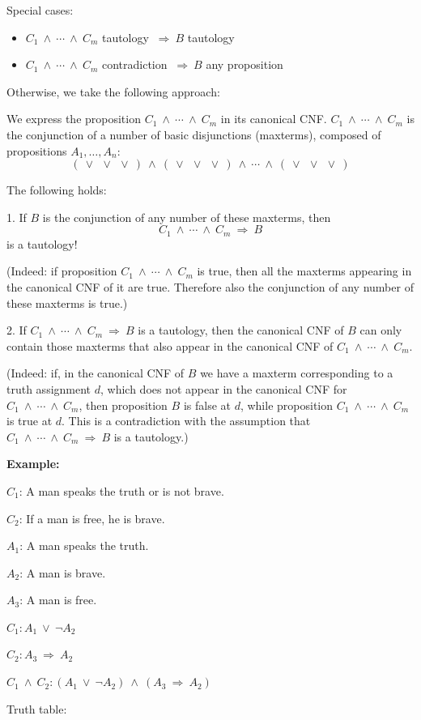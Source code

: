 \documentclass[11pt,paper=b5,footinclude,headinclude]{scrbook} %
\def\ali {{~\vee~}}
\def\inn {{~\wedge~}}
\def\sledi {{~\Rightarrow~}}
\theoremstyle{remark}
\theoremstyle{definition} %
\theoremstyle{theorem} %
\begin{document}
Special cases:
\begin{itemize}
  \item $C_1\inn\cdots\inn C_m$ tautology  $\sledi B$ tautology
  \item $C_1\inn\cdots\inn C_m$ contradiction $\sledi B$ any proposition
\end{itemize}

Otherwise, we take the following approach:

We express the proposition $C_1\inn\cdots\inn C_m$ in its canonical CNF.
$C_1\inn\cdots\inn C_m$ is the conjunction of a number of basic disjunctions (maxterms), composed of
propositions $A_1,\ldots, A_n$:
$$( \ali\ali\ali) \inn ( \ali\ali\ali) \inn \cdots \inn (\ali\ali\ali)$$

The following holds:

1. If $B$ is the conjunction of any number of these maxterms, then
$$C_1\inn\cdots\inn C_m\sledi B$$
is a tautology!

(Indeed: if proposition $C_1\inn\cdots\inn C_m$ is true, then all the maxterms appearing in the canonical CNF of it are true. Therefore also the conjunction of any number of these maxterms is true.)

2. If $C_1\inn\cdots\inn C_m\sledi B$ is a tautology, then the canonical CNF of $B$ can only contain those maxterms that also appear
in the canonical CNF of $C_1\inn\cdots\inn C_m$.

(Indeed: if, in the canonical CNF of $B$ we have a maxterm corresponding to a truth assignment $d$, which does not appear in the canonical CNF for
$C_1\inn\cdots\inn C_m$, then proposition $B$ is false at $d$, while proposition $C_1\inn\cdots\inn C_m$ is true at $d$. This is a contradiction with the assumption that  $C_1\inn\cdots\inn C_m\sledi B$ is a tautology.)

\bigskip
\textbf{ Example:}

$C_1$: A man speaks the truth or is not brave.

$C_2$: If a man is free, he is brave.

\medskip
$A_1$: A man speaks the truth.

$A_2$: A man is brave.

$A_3$: A man is free.

\medskip

$C_1: A_1\ali \neg A_2$

$C_2: A_3\sledi A_2$

$C_1\inn C_2: (A_1\ali \neg A_2) \inn (A_3\sledi A_2)$

\medskip
Truth table:
\end{document}
